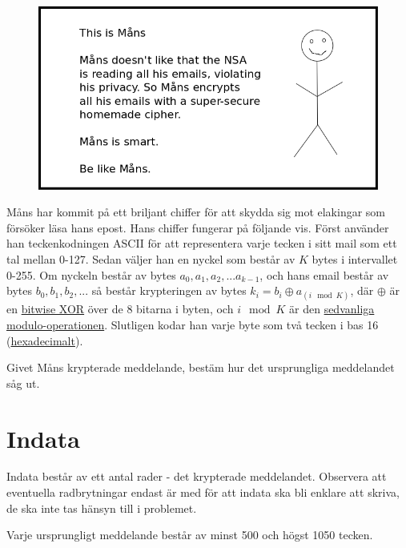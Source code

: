 
\begin{center}
  \begin{figure}[h!]
    \includegraphics[width=\textwidth]{mans.png}
  \end{figure}
\end{center}

Måns har kommit på ett briljant chiffer för att skydda sig mot elakingar som försöker läsa hans epost. Hans chiffer fungerar på följande vis. Först använder han teckenkodningen ASCII för att representera varje tecken i sitt mail som ett tal mellan 0-127. Sedan väljer han en nyckel som består av $K$ bytes i intervallet 0-255. Om nyckeln består av bytes $a_0, a_1, a_2, ... a_{k - 1}$, och hans email består av bytes $b_0, b_1, b_2, ...$ så består krypteringen
av bytes $k_i = b_i \oplus a_{(i \mod K)}$, där $\oplus$ är en \href{https://en.wikipedia.org/wiki/Bitwise\_operation#XOR}{bitwise XOR} över de 8 bitarna i byten, och $i \mod K$ är den \href{https://en.wikipedia.org/wiki/Modulo\_operation}{sedvanliga modulo-operationen}. Slutligen kodar han varje byte som två tecken i bas 16 (\href{https://en.wikipedia.org/wiki/Hexadecimal}{hexadecimalt}).

Givet Måns krypterade meddelande, bestäm hur det ursprungliga meddelandet såg ut.

\section*{Indata}
Indata består av ett antal rader - det krypterade meddelandet. Observera att eventuella radbrytningar endast är med för att indata ska bli enklare att skriva, de ska inte tas hänsyn till i problemet.

Varje ursprungligt meddelande består av minst 500 och högst 1050 tecken.

